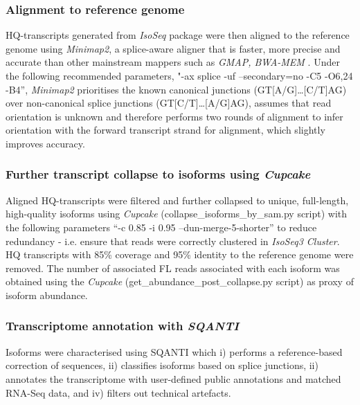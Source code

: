 \newpage
\subsubsection{Alignment to reference genome} 
HQ-transcripts generated from \textit{IsoSeq} package were then aligned to the reference genome using \textit{Minimap2}, a splice-aware aligner that is faster, more precise and accurate than other mainstream mappers such as \textit{GMAP, BWA-MEM} \cite{SimirKriZanoviC2018,Tang2020}. Under the following recommended parameters, "-ax splice -uf --secondary=no -C5 -O6,24 -B4”,  \textit{Minimap2} prioritises the known canonical junctions (GT[A/G]…[C/T]AG) over non-canonical splice junctions (GT[C/T]…[A/G]AG), assumes that read orientation is unknown and therefore performs two rounds of alignment to infer orientation with the forward transcript strand for alignment, which slightly improves accuracy. 

\subsubsection{Further transcript collapse to isoforms using \textit{Cupcake}}
Aligned HQ-transcripts were filtered and further collapsed 
to unique, full-length, high-quality isoforms using \textit{Cupcake} (collapse\_isoforms\_by\_sam.py script) with the following parameters  “-c 0.85 -i 0.95 --dun-merge-5-shorter” to reduce redundancy - i.e. ensure that reads were correctly clustered in \textit{IsoSeq3 Cluster}. HQ transcripts with 85\% coverage and 95\% identity to the reference genome were removed. The number of associated FL reads associated with each isoform was obtained using the \textit{Cupcake} (get\_abundance\_post\_collapse.py script) as proxy of isoform abundance.   
 
\subsubsection{Transcriptome annotation with \textit{SQANTI}}
\label{section: sqanti_annotations}
Isoforms were characterised using SQANTI\cite{Tardaguila2018} which i) performs a reference-based correction of sequences, ii) classifies isoforms based on splice junctions, ii) annotates the transcriptome with user-defined public annotations and matched RNA-Seq data, and iv) filters out technical artefacts. 

